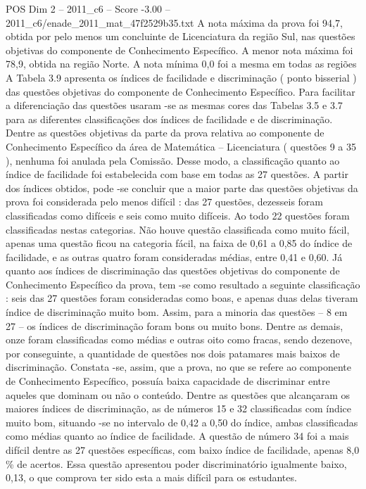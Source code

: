 \begin{textsample}{POS Dim 2 – 2011\_c6 – Score -3.00 – 2011\_c6/enade\_2011\_mat\_47f2529b35.txt}
A nota máxima da prova foi 94,7, obtida por pelo menos um concluinte de Licenciatura da região Sul, nas questões objetivas do componente de Conhecimento Específico.
A menor nota máxima foi 78,9, obtida na região Norte.
A nota mínima 0,0 foi a mesma em todas as regiões A Tabela 3.9 apresenta os índices de facilidade e discriminação ( ponto bisserial ) das questões objetivas do componente de Conhecimento Específico.
Para facilitar a diferenciação das questões usaram -se as mesmas cores das Tabelas 3.5 e 3.7 para as diferentes classificações dos índices de facilidade e de discriminação.
Dentre as questões objetivas da parte da prova relativa ao componente de Conhecimento Específico da área de Matemática – Licenciatura ( questões 9 a 35 ), nenhuma foi anulada pela Comissão.
Desse modo, a classificação quanto ao índice de facilidade foi estabelecida com base em todas as 27 questões.
A partir dos índices obtidos, pode -se concluir que a maior parte das questões objetivas da prova foi considerada pelo menos difícil : das 27 questões, dezesseis foram classificadas como difíceis e seis como muito difíceis.
Ao todo 22 questões foram classificadas nestas categorias.
Não houve questão classificada como muito fácil, apenas uma questão ficou na categoria fácil, na faixa de 0,61 a 0,85 do índice de facilidade, e as outras quatro foram consideradas médias, entre 0,41 e 0,60.
Já quanto aos índices de discriminação das questões objetivas do componente de Conhecimento Específico da prova, tem -se como resultado a seguinte classificação : seis das 27 questões foram consideradas como boas, e apenas duas delas tiveram índice de discriminação muito bom.
Assim, para a minoria das questões – 8 em 27 – os índices de discriminação foram bons ou muito bons.
Dentre as demais, onze foram classificadas como médias e outras oito como fracas, sendo dezenove, por conseguinte, a quantidade de questões nos dois patamares mais baixos de discriminação.
Constata -se, assim, que a prova, no que se refere ao componente de Conhecimento Específico, possuía baixa capacidade de discriminar entre aqueles que dominam ou não o conteúdo.
Dentre as questões que alcançaram os maiores índices de discriminação, as de números 15 e 32 classificadas com índice muito bom, situando -se no intervalo de 0,42 a 0,50 do índice, ambas classificadas como médias quanto ao índice de facilidade.
A questão de número 34 foi a mais difícil dentre as 27 questões específicas, com baixo índice de facilidade, apenas 8,0 \% de acertos.
Essa questão apresentou poder discriminatório igualmente baixo, 0,13, o que comprova ter sido esta a mais difícil para os estudantes.

\end{textsample}
